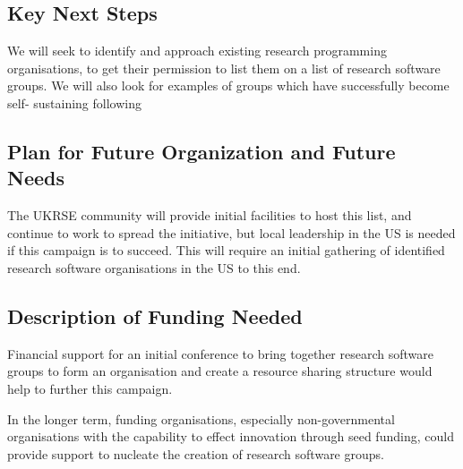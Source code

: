 \subsection{Key Next Steps}

We will seek to identify and approach existing research programming organisations,
to get their permission to list them on a list of research software groups.
We will also look for examples of groups which have successfully become self-
sustaining following

\subsection{Plan for Future Organization and Future Needs}

The UKRSE community will provide initial facilities to host this list, and
continue to work to spread the initiative, but local leadership in the US
is needed if this campaign is to succeed. This will require an initial gathering
of identified research software organisations in the US to this end.

\subsection{Description of Funding Needed}

Financial support for an initial conference to bring together research software
groups to form an organisation and create a resource sharing structure would
help to further this campaign.

In the longer term, funding organisations, especially non-governmental organisations
with the capability to effect innovation through seed funding, could provide
support to nucleate the creation of research software groups.
